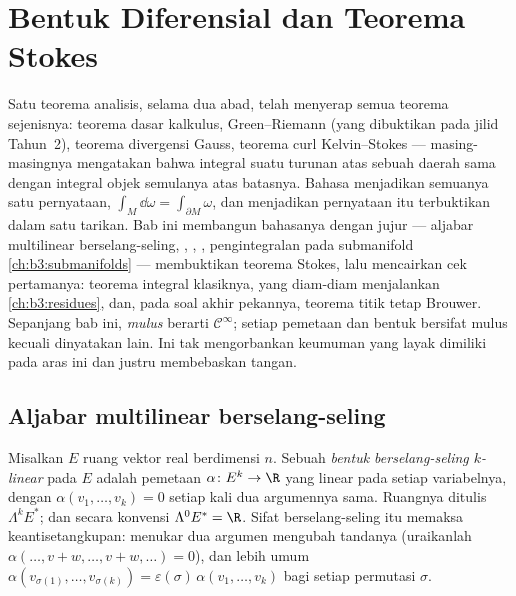 \chapter{Bentuk Diferensial dan Teorema Stokes}\label{ch:b3:forms}

Satu teorema analisis, selama dua abad, telah menyerap semua
teorema sejenisnya: teorema dasar kalkulus,
Green--Riemann (yang dibuktikan pada jilid Tahun~2), teorema
divergensi Gauss, teorema curl Kelvin--Stokes --- masing-masingnya
mengatakan bahwa integral suatu turunan atas sebuah daerah sama dengan
integral objek semulanya atas batasnya. Bahasa
\emph{} menjadikan semuanya satu pernyataan,
$\int_M\dd\omega = \int_{\partial M}\omega$, dan menjadikan pernyataan
itu terbuktikan dalam satu tarikan. Bab ini membangun
bahasanya dengan jujur --- aljabar multilinear berselang-seling,
, , , pengintegralan pada
submanifold \cref{ch:b3:submanifolds} --- membuktikan teorema
Stokes, lalu mencairkan cek pertamanya: teorema integral
klasiknya,  yang diam-diam menjalankan
\cref{ch:b3:residues}, dan, pada soal akhir pekannya, teorema
titik tetap Brouwer. Sepanjang bab ini, \emph{mulus} berarti $\mathcal
C^\infty$; setiap pemetaan dan bentuk bersifat mulus kecuali
dinyatakan lain. Ini tak mengorbankan keumuman yang layak dimiliki pada
aras ini dan justru membebaskan tangan.

\section{Aljabar multilinear berselang-seling}

\begin{definition}\label{def:b3:forms:alternating}
Misalkan $E$ ruang vektor real berdimensi $n$. Sebuah
\emph{bentuk berselang-seling $k$-linear}
pada $E$ adalah pemetaan $\alpha\colon E^k \to \R$ yang linear pada setiap
variabelnya, dengan $\alpha(v_1, \dots, v_k) = 0$ setiap kali dua
argumennya sama. Ruangnya ditulis $\Lambda^k E^*$;
dan secara konvensi $\Lambda^0E^* = \R$. Sifat berselang-seling itu memaksa
keantisetangkupan: menukar dua argumen mengubah tandanya
(uraikanlah $\alpha(\dots, v + w, \dots, v + w, \dots) = 0$), dan
lebih umum $\alpha(v_{\sigma(1)}, \dots, v_{\sigma(k)}) =
\varepsilon(\sigma)\,\alpha(v_1, \dots, v_k)$ bagi setiap
permutasi $\sigma$.
\end{definition}

